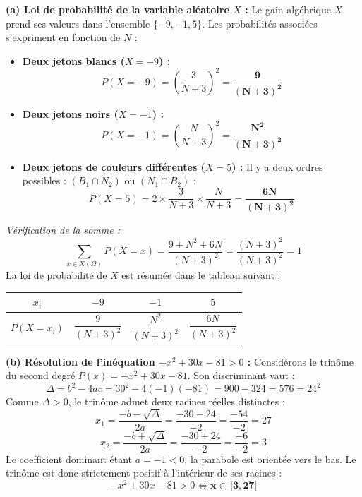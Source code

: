 \documentclass[11pt,a4paper]{article}
\begin{document}
\begin{correctionbox}
\textbf{(a) Loi de probabilité de la variable aléatoire $X$ :}
Le gain algébrique $X$ prend ses valeurs dans l'ensemble $\{-9, -1, 5\}$.
Les probabilités associées s'expriment en fonction de $N$ :
\begin{itemize}[label=$\bullet$]
    \item \textbf{Deux jetons blancs ($X = -9$) :}
    \[
    P(X = -9) = \left(\frac{3}{N+3}\right)^2 = \mathbf{\frac{9}{(N+3)^2}}
    \]
    \item \textbf{Deux jetons noirs ($X = -1$) :}
    \[
    P(X = -1) = \left(\frac{N}{N+3}\right)^2 = \mathbf{\frac{N^2}{(N+3)^2}}
    \]
    \item \textbf{Deux jetons de couleurs différentes ($X = 5$) :}
    Il y a deux ordres possibles : $(B_1 \cap N_2)$ ou $(N_1 \cap B_2)$ :
    \[
    P(X = 5) = 2 \times \frac{3}{N+3} \times \frac{N}{N+3} = \mathbf{\frac{6N}{(N+3)^2}}
    \]
\end{itemize}
\emph{Vérification de la somme :}
\[
\sum_{x \in X(\Omega)} P(X = x) = \frac{9 + N^2 + 6N}{(N+3)^2} = \frac{(N+3)^2}{(N+3)^2} = 1
\]
La loi de probabilité de $X$ est résumée dans le tableau suivant :
\begin{center}
\renewcommand{\arraystretch}{1.5}
\begin{tabular}{|c|c|c|c|}
    \hline
    $x_i$ & $-9$ & $-1$ & $5$ \\
    \hline
    $P(X = x_i)$ & $\dfrac{9}{(N+3)^2}$ & $\dfrac{N^2}{(N+3)^2}$ & $\dfrac{6N}{(N+3)^2}$ \\
    \hline
\end{tabular}
\end{center}

\textbf{(b) Résolution de l'inéquation $-x^2 + 30x - 81 > 0$ :}
Considérons le trinôme du second degré $P(x) = -x^2 + 30x - 81$.
Son discriminant vaut :
\[
\Delta = b^2 - 4ac = 30^2 - 4(-1)(-81) = 900 - 324 = 576 = 24^2
\]
Comme $\Delta > 0$, le trinôme admet deux racines réelles distinctes :
\[
x_1 = \frac{-b - \sqrt{\Delta}}{2a} = \frac{-30 - 24}{-2} = \frac{-54}{-2} = 27
\]
\[
x_2 = \frac{-b + \sqrt{\Delta}}{2a} = \frac{-30 + 24}{-2} = \frac{-6}{-2} = 3
\]
Le coefficient dominant étant $a = -1 < 0$, la parabole est orientée vers le bas. Le trinôme est donc strictement positif à l'intérieur de ses racines :
\[
-x^2 + 30x - 81 > 0 \iff \mathbf{x \in \,]3, 27[}
\]


\end{correctionbox}
\end{document}
